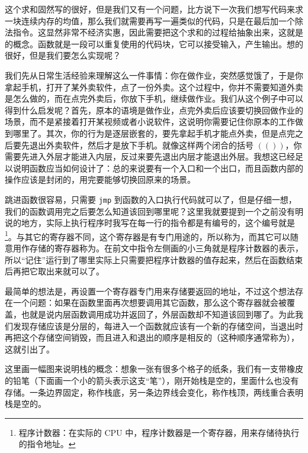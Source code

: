 这个求和固然写的很好，但是我们又有一个问题，比方说下一次我们想写代码来求一块连续内存的均值，那么我们就需要再写一遍类似的代码，只是在最后加一个除法指令。这显然非常不经济实惠，因此需要把这个求和的过程给抽象出来，这就是的概念。函数就是一段可以重复使用的代码块，它可以接受输入，产生输出。想的很好，但是我们要怎么实现呢？

我们先从日常生活经验来理解这么一件事情：你在做作业，突然感觉饿了，于是你拿起手机，打开了某外卖软件，点了一份外卖。这个过程中，你并不需要知道外卖是怎么做的，而在点完外卖后，你放下手机，继续做作业。我们从这个例子中可以得到什么启发呢？首先，原本的语境是做作业，点完外卖后应该要切换回做作业的场景，而不是紧接着打开某视频或者小说软件，这说明你需要记住你原本的工作做到哪里了。其次，你的行为是逐层嵌套的，要先拿起手机才能点外卖，但是点完之后要先退出外卖软件，然后才是放下手机。就像这样两个闭合的括号 $(())$，你需要先进入外层才能进入内层，反过来要先退出内层才能退出外层。我想这已经足以说明函数应当如何设计了：总的来说要有一个入口和一个出口，而且函数内部的操作应该是封闭的，用完要能够切换回原来的场景。

跳进函数很容易，只需要 \texttt{jmp} 到函数的入口执行代码就可以了，但是仔细一想，我们的函数调用完之后要怎么知道该回到哪里呢？这里我就要提到一个之前没有明说的地方，实际上执行程序时我写在每一行的指令都是有编号的，这个编号就是\footnote{程序计数器：在实际的 CPU 中，程序计数器是一个寄存器，用来存储待执行的指令地址。}。与其它的寄存器不同，这个寄存器是有专门用途的，所以称为，而其它可以随意用作存储的寄存器称为。在前文中指令左侧画的小三角就是程序计数器的表示，所以“记住”运行到了哪里实际上只需要把程序计数器的值存起来，然后在函数结束后再把它取出来就可以了。

最简单的想法是，再设置一个寄存器专门用来存储要返回的地址，不过这个想法存在一个问题：如果在函数里面再次想要调用其它函数，那么这个寄存器就会被覆盖，也就是说内层函数调用成功并返回了，外层函数却不知道该回到哪了。为此我们发现存储应该是分层的，每进入一个函数就应该有一个新的存储空间，当退出时再把这个存储空间销毁，而且进入和退出的顺序是相反的（这种顺序通常称为），这就引出了。

这里画一幅图来说明栈的概念：想象一张有很多个格子的纸条，我们有一支带橡皮的铅笔（下面画一个小的箭头表示这支“笔”），刚开始栈是空的，里面什么也没有存储。一条边界固定，称作栈底，另一条边界线会变化，称作栈顶，两线重合表明栈是空的。
\begin{figure}[H]
    \centering
\end{figure}

